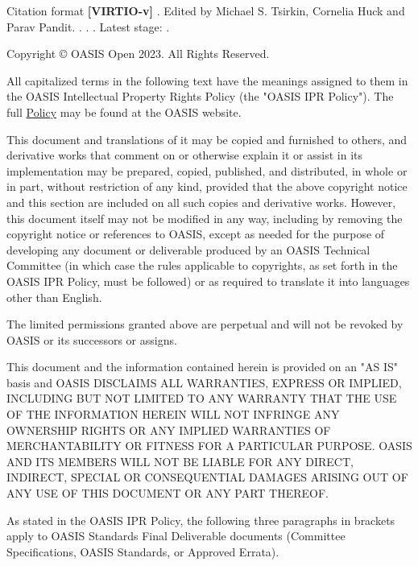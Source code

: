 \begin{titlepage}
\begin{oasistitlesection}{Citation format}
\textbf{[VIRTIO-v\virtiorev]}\newline
\textit{\virtioversion}. Edited by Michael S. Tsirkin, Cornelia Huck and Parav Pandit. \virtioworkingdraftdate.
\virtiodraftoasisstagename \virtiodraftstageextra . \virtiourlhtml .
Latest stage: \virtiourllatesthtml .
\end{oasistitlesection}

\vfill\newpage


Copyright © OASIS Open 2023. All Rights Reserved.

All capitalized terms in the following text have the meanings assigned
to them in the OASIS Intellectual Property Rights Policy (the "OASIS
IPR Policy"). The full \href{https://www.oasis-open.org/policies-guidelines/ipr/}{Policy} may be found at the OASIS website.

This document and translations of it may be copied and furnished to
others, and derivative works that comment on or otherwise explain it
or assist in its implementation may be prepared, copied, published,
and distributed, in whole or in part, without restriction of any kind,
provided that the above copyright notice and this section are included
on all such copies and derivative works. However, this document itself
may not be modified in any way, including by removing the copyright
notice or references to OASIS, except as needed for the purpose of
developing any document or deliverable produced by an OASIS Technical
Committee (in which case the rules applicable to copyrights, as set
forth in the OASIS IPR Policy, must be followed) or as required to
translate it into languages other than English.

The limited permissions granted above are perpetual and will not be
revoked by OASIS or its successors or assigns.

This document and the information contained herein is provided on an
"AS IS" basis and OASIS DISCLAIMS ALL WARRANTIES, EXPRESS OR IMPLIED,
INCLUDING BUT NOT LIMITED TO ANY WARRANTY THAT THE USE OF THE
INFORMATION HEREIN WILL NOT INFRINGE ANY OWNERSHIP RIGHTS OR ANY
IMPLIED WARRANTIES OF MERCHANTABILITY OR FITNESS FOR A PARTICULAR
PURPOSE. OASIS AND ITS MEMBERS WILL NOT BE LIABLE FOR ANY DIRECT,
INDIRECT, SPECIAL OR CONSEQUENTIAL DAMAGES ARISING OUT OF ANY USE
OF THIS DOCUMENT OR ANY PART THEREOF.

As stated in the OASIS IPR Policy, the following three paragraphs
in brackets apply to OASIS Standards Final Deliverable documents
(Committee Specifications, OASIS Standards, or Approved Errata).


\end{titlepage}
